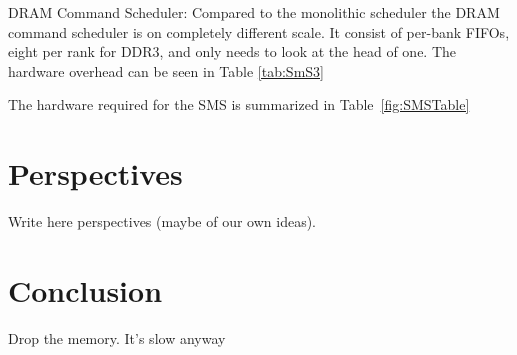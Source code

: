 \documentclass[12pt,journal,compsoc]{IEEEtran}
\begin{document}
DRAM Command Scheduler:   Compared to the monolithic scheduler the DRAM command scheduler is on completely different scale.  It consist of per-bank FIFOs, eight per rank for DDR3, and only needs to look at the head of one. The hardware overhead can be seen in Table \ref{tab:SmS3}

\begin{table}[H]
  \centering
  \caption{Storage Overhead of Stage 3: DRAM Command Scheduler \cite{SmS}}\label{tab:SmS3}
\end{table}
The hardware required for the SMS is summarized in Table~\ref{fig:SMSTable}




\section{Perspectives}
Write here perspectives (maybe of our own ideas).

\section{Conclusion}
Drop the memory. It's slow anyway


%
\end{document}
